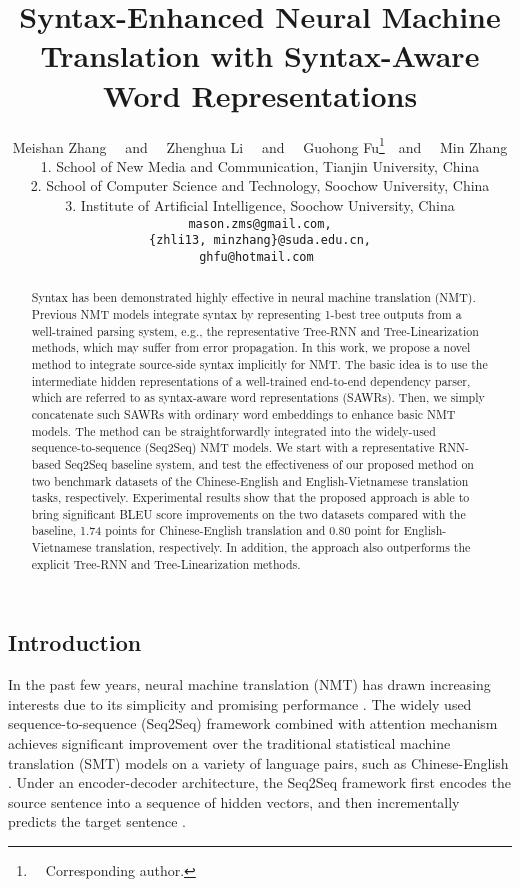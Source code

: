 \documentclass[11pt,a4paper]{article}
\title{Syntax-Enhanced Neural Machine Translation with Syntax-Aware Word Representations}
\author{Meishan Zhang ~~\textnormal{and}~~ Zhenghua Li ~~\textnormal{and}~~ Guohong Fu\thanks{~~Corresponding author.}~~\textnormal{and}~~ Min Zhang \\
1. School of New Media and Communication, Tianjin University, China \\
2. School of Computer Science and Technology, Soochow University, China \\
3. Institute of Artificial Intelligence, Soochow University, China \\
{\tt mason.zms@gmail.com,} \\
{\tt \{zhli13, minzhang\}@suda.edu.cn,} \\
{\tt ghfu@hotmail.com }
}
\date{}
\begin{document}
\begin{CJK}{UTF8}{gbsn}

\maketitle
\begin{abstract}
Syntax has been demonstrated highly effective in neural machine translation (NMT).
Previous NMT models integrate syntax by representing 1-best tree outputs from a well-trained parsing system,
e.g., the representative Tree-RNN and Tree-Linearization methods, which may suffer from error propagation.
In this work, we propose a novel method to integrate source-side syntax implicitly for NMT.
The basic idea is to use the intermediate hidden representations of a well-trained end-to-end dependency parser,
which are referred to as syntax-aware word representations (SAWRs).
Then, we simply concatenate such SAWRs with ordinary word embeddings to enhance basic NMT models.
The method can be straightforwardly integrated into the widely-used sequence-to-sequence (Seq2Seq) NMT models.
We start with a representative RNN-based Seq2Seq baseline system,
and test the effectiveness of our proposed method on two benchmark datasets of the Chinese-English and English-Vietnamese translation tasks, respectively.
Experimental results show that the proposed approach is able to bring significant BLEU score improvements on the two datasets compared with the baseline,
1.74 points for Chinese-English translation and 0.80 point for English-Vietnamese translation, respectively.
In addition, the approach also outperforms the explicit Tree-RNN and Tree-Linearization methods.
\end{abstract}


\section{Introduction}

In the past few years, neural machine translation (NMT) has drawn increasing interests
due to its simplicity and promising performance \cite{bahdanau2014neural,jean2015montreal,stanfordmt2015,luong-pham-manning:2015:EMNLP,shen-EtAl:2016:P16-1,vaswani2017attention}.
The widely used
sequence-to-sequence (Seq2Seq) framework combined with attention mechanism achieves
significant improvement over the traditional statistical machine translation (SMT) models
on a variety of language pairs, such as Chinese-English \cite{shi-padhi-knight:2016:EMNLP2016,mi-EtAl:2016:EMNLP2016,vaswani2017attention,yongcheng:2018:ACLMain}.
Under an encoder-decoder architecture,
the Seq2Seq framework first encodes the source sentence  into a sequence of hidden vectors,
and then incrementally predicts the target sentence \cite{cho-EtAl:2014:SSST-8}.


\end{CJK}
\end{document}
